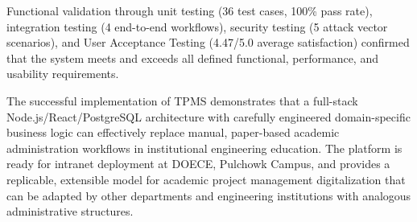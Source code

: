 Functional validation through unit testing (36 test cases, 100\% pass rate), integration testing (4 end-to-end workflows), security testing (5 attack vector scenarios), and User Acceptance Testing (4.47/5.0 average satisfaction) confirmed that the system meets and exceeds all defined functional, performance, and usability requirements.

The successful implementation of TPMS demonstrates that a full-stack Node.js/React/PostgreSQL architecture with carefully engineered domain-specific business logic can effectively replace manual, paper-based academic administration workflows in institutional engineering education. The platform is ready for intranet deployment at DOECE, Pulchowk Campus, and provides a replicable, extensible model for academic project management digitalization that can be adapted by other departments and engineering institutions with analogous administrative structures.

